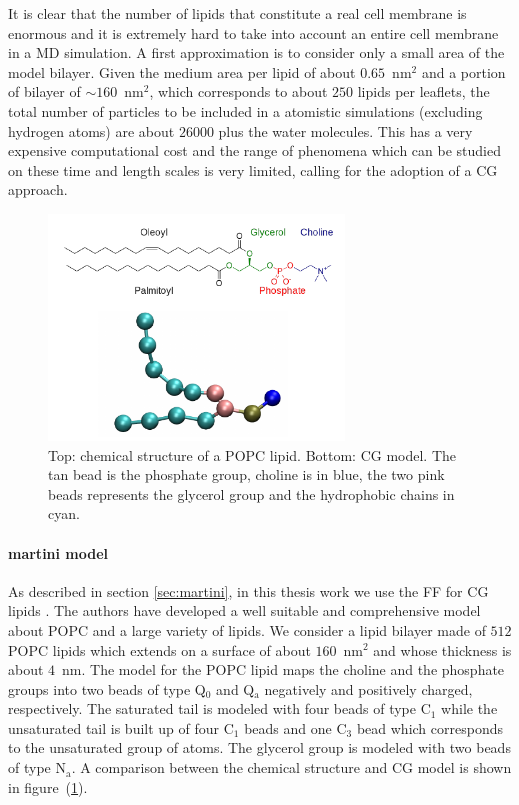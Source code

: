 It is clear that the number of lipids that constitute a real cell membrane is enormous and it is extremely hard to take into account an entire cell membrane in a \ac{MD} simulation. A first approximation is to consider only a small area of the model bilayer. Given the medium area per lipid of about $0.65$~nm$^2$ and a portion of bilayer of $\sim 160$~nm$^2$, which corresponds to about $250$ lipids per leaflets, the total number of particles to be included in a atomistic simulations (excluding hydrogen atoms) are about $26000$ plus the water molecules. This has a very expensive computational cost and the range of phenomena which can be studied on these time and length scales is very limited, calling for the adoption of a \ac{CG} approach.

\begin{figure}[!ht]
	\centering
	\includegraphics[width=0.7\textwidth]{./img/POPC/popc}
	\caption{Top: chemical structure of a \acs{POPC} lipid. Bottom: \martini \acs{CG} model. The tan bead is the phosphate group, choline is in blue, the two pink beads represents the glycerol group and the hydrophobic chains in cyan.}
	\label{fig:popc}
\end{figure}

\paragraph{\textbf{martini model}} As described in section \ref{sec:martini}, in this thesis work we use the \martini \ac{FF} for \ac{CG} lipids \cite{Martini}. The authors have developed a well suitable and comprehensive model about \ac{POPC} and a large variety of lipids. We consider a lipid bilayer made of $512$ \ac{POPC} lipids which extends on a surface of about $160$~nm$^2$ and whose thickness is about $4$~nm. The \martini model for the \ac{POPC} lipid maps the choline and the phosphate groups into two beads of type Q$_0$ and Q$_\text{a}$ negatively and positively charged, respectively. The saturated tail is modeled with four beads of type C$_1$ while the unsaturated tail is built up of four C$_1$ beads and one C$_3$ bead which corresponds to the unsaturated group of atoms. The glycerol group is modeled with two beads of type N$_\text{a}$. A comparison between the chemical structure and \ac{CG} model is shown in figure~(\ref{fig:popc}).

